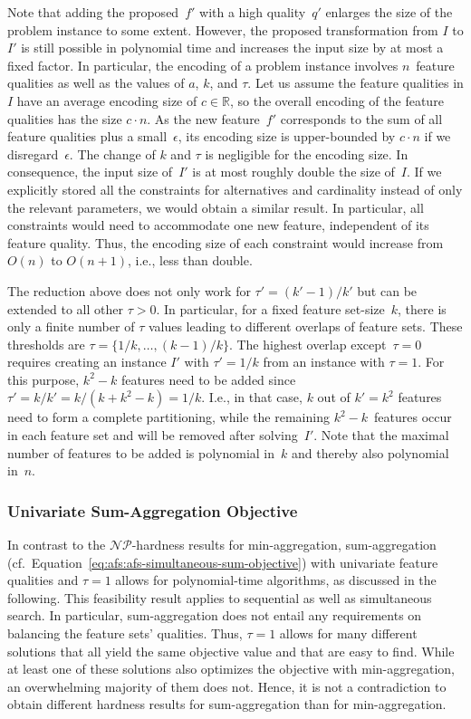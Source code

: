 \documentclass{article}
\theoremstyle{definition}
\begin{document}
%
Note that adding the proposed~$f'$ with a high quality~$q'$ enlarges the size of the problem instance to some extent.
However, the proposed transformation from $I$ to $I'$ is still possible in polynomial time and increases the input size by at most a fixed factor.
In particular, the encoding of a problem instance involves $n$~feature qualities as well as the values of $a$, $k$, and $\tau$.
Let us assume the feature qualities in $I$ have an average encoding size of $c \in \mathbb{R}$, so the overall encoding of the feature qualities has the size $c \cdot n$.
As the new feature~$f'$ corresponds to the sum of all feature qualities plus a small~$\epsilon$, its encoding size is upper-bounded by $c \cdot n$ if we disregard~$\epsilon$.
The change of $k$ and $\tau$ is negligible for the encoding size.
In consequence, the input size of~$I'$ is at most roughly double the size of~$I$.
If we explicitly stored all the constraints for alternatives and cardinality instead of only the relevant parameters, we would obtain a similar result.
In particular, all constraints would need to accommodate one new feature, independent of its feature quality.
Thus, the encoding size of each constraint would increase from $O(n)$ to $O(n+1)$, i.e., less than double.

The reduction above does not only work for $\tau' = (k' - 1) / k'$ but can be extended to all other $\tau > 0$.
In particular, for a fixed feature set-size~$k$, there is only a finite number of $\tau$ values leading to different overlaps of feature sets.
These thresholds are $\tau = \{1/k, \dots, (k - 1) / k\}$.
The highest overlap except~$\tau=0$ requires creating an instance $I'$ with $\tau'= 1/k$ from an instance with $\tau = 1$.
For this purpose, $k^2 - k$ features need to be added since $\tau' = k / k' = k / (k + k^2 -k) = 1/k$.
I.e., in that case, $k$ out of $k' = k^2$ features need to form a complete partitioning, while the remaining $k^2 - k$~features occur in each feature set and will be removed after solving~$I'$.
Note that the maximal number of features to be added is polynomial in~$k$ and thereby also polynomial in~$n$.

\subsubsection{Univariate Sum-Aggregation Objective}
\label{sec:afs:appendix:complexity:uni-sum}

In contrast to the $\mathcal{NP}$-hardness results for min-aggregation, sum-aggregation (cf.~Equation~\ref{eq:afs:afs-simultaneous-sum-objective}) with univariate feature qualities and $\tau=1$ allows for polynomial-time algorithms, as discussed in the following.
This feasibility result applies to sequential as well as simultaneous search.
In particular, sum-aggregation does not entail any requirements on balancing the feature sets' qualities.
Thus, $\tau=1$ allows for many different solutions that all yield the same objective value and that are easy to find.
While at least one of these solutions also optimizes the objective with min-aggregation, an overwhelming majority of them does not.
Hence, it is not a contradiction to obtain different hardness results for sum-aggregation than for min-aggregation.
\end{document}
